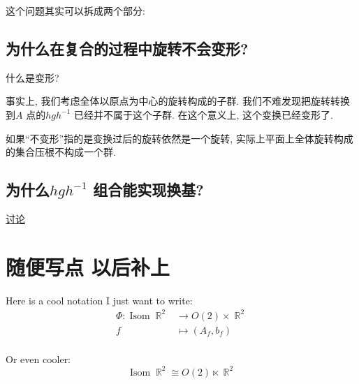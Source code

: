 \documentclass{article}
\DeclareMathOperator{\Isom}{\mathrm{Isom}}
\DeclareMathOperator{\R}{\mathbb{R}}
\begin{document}
这个问题其实可以拆成两个部分:
\subsection{为什么在复合的过程中旋转不会变形?}
什么是变形?

事实上, 我们考虑全体以原点为中心的旋转构成的子群. 我们不难发现把旋转转换到\(A\) 点的\(hgh^{-1}\)
已经并不属于这个子群. 在这个意义上, 这个变换已经变形了.

如果``不变形''指的是变换过后的旋转依然是一个旋转, 实际上平面上全体旋转构成的集合压根不构成一个群.

\subsection{为什么\(hgh^{-1}\) 组合能实现换基?}

\href{https://math.stackexchange.com/questions/11971/intuition-behind-conjugation-in-group-theory}{讨论}

\section{随便写点 以后补上}
Here is a cool notation I just want to write:
\begin{align*}
    \Phi:\Isom \R^{2} &\to O(2) \times \R^{2} \\
    f &\mapsto (A_{f}, b_{f}) \\
\end{align*}

Or even cooler:
\[
    \Isom \R^{2} \cong O(2) \ltimes \R^{2}
\]
\end{document}
